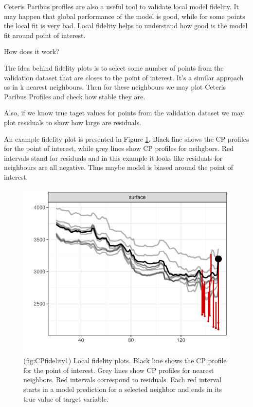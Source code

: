 \documentclass[]{krantz}
\theoremstyle{definition}
\theoremstyle{definition}
\theoremstyle{definition}
\theoremstyle{remark}
\begin{document}
Ceteris Paribus profiles are also a useful tool to validate local model
fidelity. It may happen that global performance of the model is good,
while for some points the local fit is very bad. Local fidelity helps to
understand how good is the model fit around point of interest.

How does it work?

The idea behind fidelity plots is to select some number of points from
the validation dataset that are closes to the point of interest. It's a
similar approach as in k nearest neighbours. Then for these neighbours
we may plot Ceteris Paribus Profiles and check how stable they are.

Also, if we know true taget values for points from the validation
dataset we may plot residuals to show how large are residuals.

An example fidelity plot is presented in Figure \ref{fig:CPfidelity1}.
Black line shows the CP profiles for the point of interest, while grey
lines show CP profiles for neihgbors. Red intervals stand for residuals
and in this example it looks like residuals for neighbours are all
negative. Thus maybe model is biased around the point of interest.

\begin{figure}

{\centering \includegraphics[width=0.7\linewidth]{figure/cp_fidelity_1} 

}

\caption{(fig:CPfidelity1) Local fidelity plots. Black line shows the CP profile for the point of interest. Grey lines show CP profiles for nearest neighbors. Red intervals correspond to residuals. Each red interval starts in a model prediction for a selected neighbor and ends in its true value of target variable.}\label{fig:CPfidelity1}
\end{figure}
\end{document}
